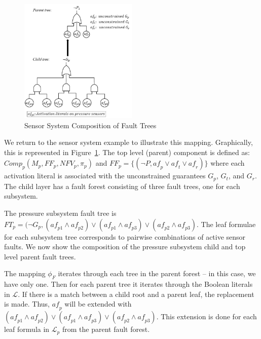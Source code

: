 \begin{figure}[h!]
	\begin{center}
		\includegraphics[width=0.5\textwidth]{images/faultCompEx.JPG}
	\end{center}
	\caption{Sensor System Composition of Fault Trees}
	\label{fig:sensorSysComp}
\end{figure}
We return to the sensor system example to illustrate this mapping. Graphically, this is represented in Figure~\ref{fig:sensorSysComp}.  The top level (parent) component is defined as: $\mathit{Comp}_p (M_p, \mathit{FF}_p, \mathit{NFV}_p, \pi_p)$ and $\mathit{FF}_p = \{(\neg P, \mathit{af}_p \lor \mathit{af}_t \lor \mathit{af}_r)\}$ where each activation literal is associated with the unconstrained guarantees $G_p$, $G_t$, and $G_r$. The child layer has a fault forest consisting of three fault trees, one for each subsystem. 

The pressure subsystem fault tree is $\mathit{FT}_{p} = (\neg G_p, (\mathit{af}_{p1} \land \mathit{af}_{p2}) \lor (\mathit{af}_{p1} \land \mathit{af}_{p3}) \lor (\mathit{af}_{p2} \land \mathit{af}_{p3}) $. The leaf formulae for each subsystem tree corresponds to pairwise combinations of active sensor faults. We now show the composition of the pressure subsystem child and top level parent fault trees. 

The mapping $\phi_F$ iterates through each tree in the parent forest -- in this case, we have only one. Then for each parent tree it iterates through the Boolean literals in $\mathcal{L}$. If there is a match between a child root and a parent leaf, the replacement is made.
Thus, $\mathit{af}_p$ will be extended with $(\mathit{af}_{p1} \land \mathit{af}_{p2}) \lor (\mathit{af}_{p1} \land \mathit{af}_{p3}) \lor (\mathit{af}_{p2} \land \mathit{af}_{p3})$. This extension is done for each leaf formula in $\mathcal{L}_p$ from the parent fault forest. 

